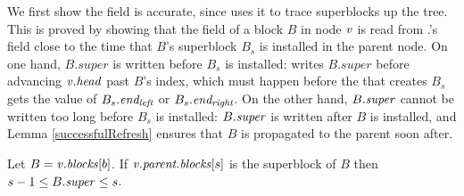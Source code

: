 We first show the  field is accurate, since  uses it to trace superblocks up the tree.  This is proved by showing that the  field of a block $B$ in node $\mbox{\textnormal{\textit{v}}}$ is read from  
.'s  field close to the time that $B$'s superblock $B_s$ is installed in the parent node.
On one hand, $B.super$ is written before $B_s$ is installed:
 writes $B.super$ before advancing $\mbox{\textnormal{\textit{v}}}.\mbox{\textit{head}}$  past $B$'s index, which must happen before the  that creates
$B_s$ gets the value of $B_s.\mbox{\textit{end\textsubscript{left}}}$ or $B_s.\mbox{\textit{end\textsubscript{right}}}$.
On the other hand, $B.\mbox{\textit{super}}$ cannot be written too long before $B_s$ is installed:
$B.\mbox{\textit{super}}$ is written after $B$ is installed, and Lemma \ref{successfulRefresh} ensures that $B$ is propagated to the
parent soon after.

\begin{lemma}
\label{superRelation}
Let $B=\mbox{\textnormal{\textit{v}}}.\mbox{\textnormal{\textit{blocks}}}[b]$.
If $\mbox{\textnormal{\textit{v}}}.\mbox{\textit{parent.blocks}}[s]$ is the superblock of $B$ then $s-1\leq B.\mbox{\textit{super}}\leq s$.
\end{lemma}
